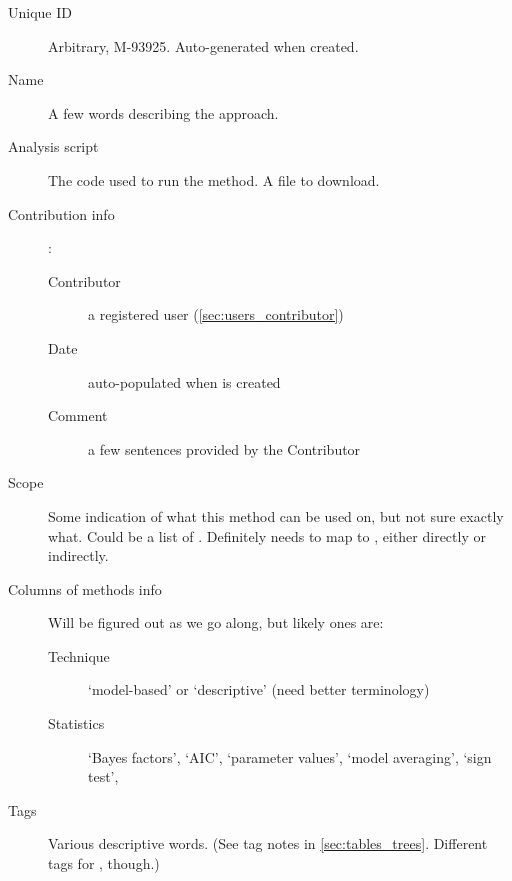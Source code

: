 \begin{description}
    \item[Unique ID] Arbitrary, \eg M-93925.  Auto-generated when created.
    \item[Name] A few words describing the approach. %
    \item[Analysis script] The code used to run the method.  A file to download.
    \item[Contribution info]:
        \begin{description}
            \item[Contributor] a registered user (\cref{sec:users_contributor})
            \item[Date] auto-populated when \Method is created
            \item[Comment] a few sentences provided by the Contributor
        \end{description}
    \item[Scope] Some indication of what this method can be used on, but not sure exactly what.
            Could be a list of \Refsets.  Definitely needs to map to \Tasks, either directly or indirectly.
    \item[Columns of methods info] Will be figured out as we go along, but likely ones are:
        \begin{description}
            \item [Technique] `model-based' or `descriptive' (need better terminology)
            \item [Statistics] `Bayes factors', `AIC', `parameter values', `model averaging', `sign test', \etc
        \end{description}
    \item [Tags] Various descriptive words. %
            (See tag notes in \cref{sec:tables_trees}.  Different tags for \Methods, though.)
\end{description}

